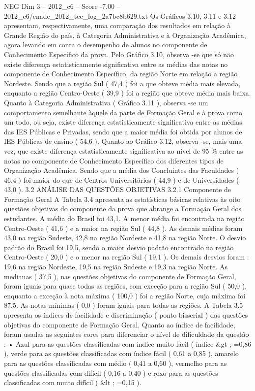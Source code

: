 \begin{textsample}{NEG Dim 3 – 2012\_c6 – Score -7.00 – 2012\_c6/enade\_2012\_tec\_log\_2a7bc8b629.txt}
Os Gráficos 3.10, 3.11 e 3.12 apresentam, respectivamente, uma comparação dos resultados em relação à Grande Região do país, à Categoria Administrativa e à Organização Acadêmica, agora levando em conta o desempenho de alunos no componente de Conhecimento Específico da prova.
Pelo Gráfico 3.10, observa -se que só não existe diferença estatisticamente significativa entre as médias das notas no componente de Conhecimento Específico, da região Norte em relação a região Nordeste.
Sendo que a região Sul ( 47,4 ) foi a que obteve média mais elevada, enquanto a região Centro-Oeste ( 39,9 ) foi a região que obteve média mais baixa.
Quanto à Categoria Administrativa ( Gráfico 3.11 ), observa -se um comportamento semelhante àquele da parte de Formação Geral e à prova como um todo, ou seja, existe diferença estatisticamente significativa entre as médias das IES Públicas e Privadas, sendo que a maior média foi obtida por alunos de IES Públicas de ensino ( 54,6 ).
Quanto ao Gráfico 3.12, observa -se, mais uma vez, que existe diferença estatisticamente significativa ao nível de 95 \% entre as notas no componente de Conhecimento Específico dos diferentes tipos de Organização Acadêmica.
Sendo que a média dos Concluintes das Faculdades ( 46,4 ) foi maior do que de Centros Universitários ( 44,9 ) e de Universidades ( 43,0 ). 3.2 ANÁLISE DAS QUESTÕES OBJETIVAS 3.2.1 Componente de Formação Geral A Tabela 3.4 apresenta as estatísticas básicas relativas às oito questões objetivas do componente da prova que abrange a Formação Geral dos estudantes.
A média do Brasil foi 43,1.
A menor média foi encontrada na região Centro-Oeste ( 41,6 ) e a maior na região Sul ( 44,8 ).
As demais médias foram 43,0 na região Sudeste, 42,8 na região Nordeste e 41,8 na região Norte.
O desvio padrão do Brasil foi 19,5, sendo o maior desvio padrão encontrado na região Centro-Oeste ( 20,0 ) e o menor na região Sul ( 19,1 ).
Os demais desvios foram : 19,6 na região Nordeste, 19,5 na região Sudeste e 19,3 na região Norte.
As medianas ( 37,5 ), nas questões objetivas do componente de Formação Geral, foram iguais para quase todas as regiões, com exceção para a região Sul ( 50,0 ), enquanto a exceção à nota máxima ( 100,0 ) foi a região Norte, cuja máxima foi 87,5.
As notas mínimas ( 0,0 ) foram iguais para todas as regiões.
A Tabela 3.5 apresenta os índices de facilidade e discriminação ( ponto bisserial ) das questões objetivas do componente de Formação Geral.
Quanto ao índice de facilidade, foram usadas as seguintes cores para diferenciar o nível de dificuldade da questão : • Azul para as questões classificadas com índice muito fácil ( índice \&gt ; =0,86 ), verde para as questões classificadas com índice fácil ( 0,61 a 0,85 ), amarelo para as questões classificadas com médio ( 0,41 a 0,60 ), vermelho para as questões classificadas com difícil ( 0,16 a 0,40 ) e roxo para as questões classificadas com muito difícil ( \&lt ; =0,15 ).

\end{textsample}
